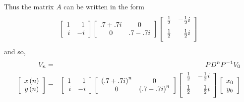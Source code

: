 \begin{solution}
Thus the matrix $A$ can be written in the form
\begin{equation*}
\leftB
\begin{array}{rr}
1 & 1 \\
i & -i
\end{array}
\rightB \leftB
\begin{array}{cc}
.7+.7i & 0 \\
0 & .7-.7i
\end{array}
\rightB \leftB
\begin{array}{rr}
\vspace{0.05in}\frac{1}{2} & -\vspace{0.05in}\frac{1}{2}i \\
\vspace{0.05in}\frac{1}{2} & \vspace{0.05in}\frac{1}{2}i
\end{array}
\rightB
\end{equation*}
and so,
\begin{eqnarray*}
V_n &=& PD^nP^{-1}V_0 \\
\leftB
\begin{array}{c}
x\left( n\right) \\
y\left( n\right)
\end{array}
\rightB &=&\leftB
\begin{array}{rr}
1 & 1 \\
i & -i
\end{array}
\rightB \leftB
\begin{array}{cc}
\left( .7+.7i\right) ^{n} & 0 \\
0 & \left( .7-.7i\right) ^{n}
\end{array}
\rightB \leftB
\begin{array}{rr}
\vspace{0.05in}\frac{1}{2} & -\vspace{0.05in}\frac{1}{2}i \\
\vspace{0.05in}\frac{1}{2} & \vspace{0.05in}\frac{1}{2}i
\end{array}
\rightB \leftB
\begin{array}{c}
x_{0} \\
y_{0}
\end{array}
\rightB
\end{eqnarray*}


\end{solution}
